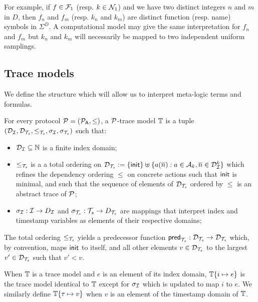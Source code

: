 For example, if $f \in \mathcal{F}_1$ (resp. $k \in \mathcal{N}_1$) and we have two distinct
integers $n$ and $m$ in $D$, then $f_n$ and $f_m$ (resp. $k_n$ and $k_m$)
are distinct function (resp. name) symbols in $\Sigma^D$.
A computational model may give the same interpretation for $f_n$ and $f_m$
but $k_n$ and $k_m$ will necessarily be mapped to two independent uniform
samplings.

\subsection{Trace models}

We define the structure which will allow us to interpret meta-logic
terms and formulas.

\begin{definition}
  For every protocol $\mathcal{P} = (\mathcal{P}_{\textsf{A}}, \leq)$, a $\mathcal{P}$-trace model $\mathbb{T}$ is a tuple
  \(
    (\mathcal{D}_{\mathcal{I}}, \mathcal{D}_{\mathcal{T}_s}, \leq_{\mathcal{T}_s}, \sigma_{\mathcal{I}}, \sigma_{\mathcal{T}_s})
  \) such that:
  \begin{itemize}
    \item $\mathcal{D}_{\mathcal{I}} \subseteq \mathbb{N}$ is a finite index domain;
    \item $\leq_{\mathcal{T}_s}$ is a a total ordering on
      $\mathcal{D}_{\mathcal{T}_s} := \{ \mathsf{init} \} \uplus \{ a(\overline{n}) : a\in\mathcal{A}_k, \overline{n}\in\mathcal{D}_{\mathcal{I}}^k
      \}$ which refines the dependency ordering $\leq$ on concrete actions such
      that $\mathsf{init}$ is minimal, and such that the sequence of elements of $\mathcal{D}_{\mathcal{T}_s}$ ordered by $\leq$ is an
      abstract trace of $\mathcal{P}$;
    \item $\sigma_{\mathcal{I}} : \mathcal{I} \to D_{\mathcal{I}}$
      and $\sigma_{\mathcal{T}_s} : {\mathcal{T}_s} \to D_{\mathcal{T}_s}$ are mappings that interpret index and
      timestamp variables as elements of their respective domains;
  \end{itemize}
\end{definition}

The total ordering $\leq_{\mathcal{T}_s}$ yields a predecessor function
$\mathsf{pred}_{\mathcal{T}_s} : \mathcal{D}_{\mathcal{T}_s}\to\mathcal{D}_{\mathcal{T}_s}$ which,
by convention, maps $\mathsf{init}$ to itself,
and all other elements $v \in \mathcal{D}_{\mathcal{T}_s}$ to the largest $v' \in \mathcal{D}_{\mathcal{T}_s}$ such that
$v' < v$.

When $\mathbb{T}$ is a trace model and $e$ is an element of its index domain,
$\mathbb{T}\{i\mapsto e\}$ is the trace model identical to $\mathbb{T}$ except for
$\sigma_{\mathcal{I}}$ which is updated to map $i$ to $e$. We similarly define
$\mathbb{T}\{\tau\mapsto v\}$ when $v$ is an element of the timestamp domain of $\mathbb{T}$.

